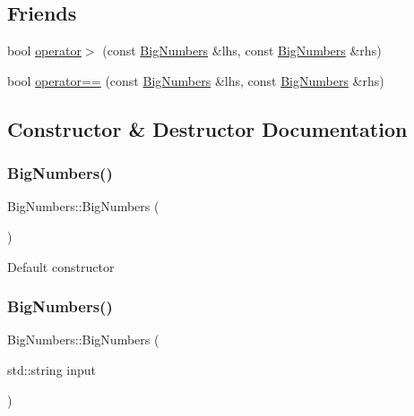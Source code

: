 \subsection*{Friends}
\begin{DoxyCompactItemize}
\item 
bool \mbox{\hyperlink{classBigNumbers_a15eeb03216484ee82af39f6934e0827f}{operator$>$}} (const \mbox{\hyperlink{classBigNumbers}{Big\+Numbers}} \&lhs, const \mbox{\hyperlink{classBigNumbers}{Big\+Numbers}} \&rhs)
\item 
bool \mbox{\hyperlink{classBigNumbers_a8ed2f27b8f4605f1afb4b11133d9883f}{operator==}} (const \mbox{\hyperlink{classBigNumbers}{Big\+Numbers}} \&lhs, const \mbox{\hyperlink{classBigNumbers}{Big\+Numbers}} \&rhs)
\end{DoxyCompactItemize}


\subsection{Constructor \& Destructor Documentation}
\mbox{\label{classBigNumbers_af3dd82883f10f3473ac83280f26b0ad8}} 
\subsubsection{\texorpdfstring{BigNumbers()}{BigNumbers()}\hspace{0.1cm}{\footnotesize\ttfamily [1/2]}}
{\footnotesize\ttfamily Big\+Numbers\+::\+Big\+Numbers (\begin{DoxyParamCaption}{ }\end{DoxyParamCaption})}

Default constructor \mbox{\label{classBigNumbers_a257470bdef0c3db4f7648fe0250e32d6}} 
\subsubsection{\texorpdfstring{BigNumbers()}{BigNumbers()}\hspace{0.1cm}{\footnotesize\ttfamily [2/2]}}
{\footnotesize\ttfamily Big\+Numbers\+::\+Big\+Numbers (\begin{DoxyParamCaption}\item[{std\+::string}]{input }\end{DoxyParamCaption})}

